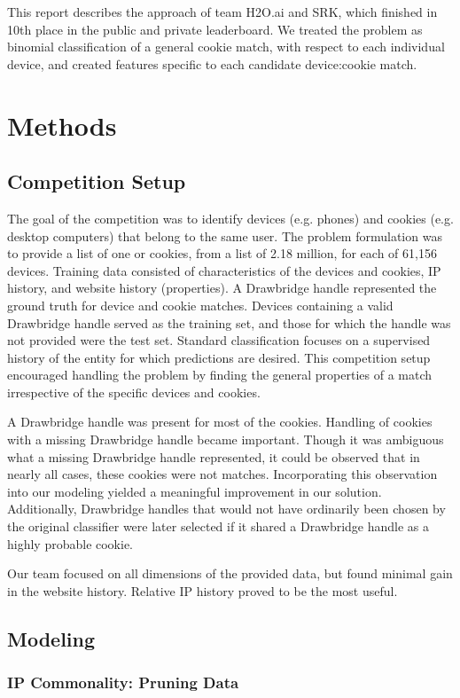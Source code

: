 \documentclass[9pt, journal]{IEEEtran}
\begin{document}
This report describes the approach of team H2O.ai and SRK, which finished in 10th place in the public and private leaderboard.
We treated the problem as binomial classification of a general cookie match, with respect to each individual device, and created features specific to each candidate device:cookie match. 

\section{Methods}
\subsection{Competition Setup}
The goal of the competition was to identify devices (e.g. phones) and cookies (e.g. desktop computers) that belong to the same user.
The problem formulation was to provide a list of one or cookies, from a list of 2.18 million, for each of 61,156 devices.
Training data consisted of characteristics of the devices and cookies, IP history, and website history (properties). 
A Drawbridge handle represented the ground truth for device and cookie matches. 
Devices containing a valid Drawbridge handle served as the training set, and those for which the handle was not provided were the test set. 
Standard classification focuses on a supervised history of the entity for which predictions are desired. This competition setup encouraged handling the problem by finding the general properties of a match irrespective of the specific devices and cookies.

A Drawbridge handle was present for most of the cookies. Handling of cookies with a missing Drawbridge handle became important. Though it was ambiguous what a missing Drawbridge handle represented, it could be observed that in nearly all cases, these cookies were not matches. 
Incorporating this observation into our modeling yielded a meaningful improvement in our solution. Additionally, Drawbridge handles that would not have ordinarily been chosen by the original classifier were later selected if it shared a Drawbridge handle as a highly probable cookie.

Our team focused on all dimensions of the provided data, but found minimal gain in the website history. Relative IP history proved to be the most useful.

\subsection{Modeling}
\subsubsection{IP Commonality: Pruning Data}
\end{document}

